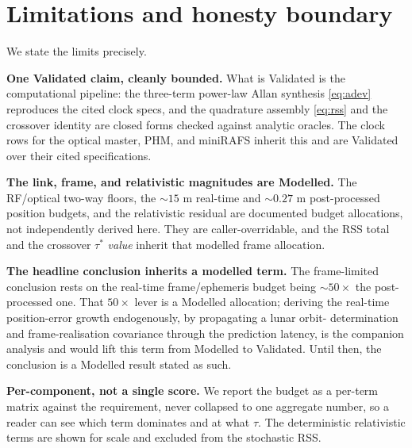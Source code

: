\documentclass[conference]{IEEEtran}
\begin{document}
\section{Limitations and honesty boundary}
\label{sec:honesty}
We state the limits precisely.

\textbf{One Validated claim, cleanly bounded.} What is Validated is the computational
pipeline: the three-term power-law Allan synthesis \eqref{eq:adev} reproduces the
cited clock specs, and the quadrature assembly \eqref{eq:rss} and the crossover
identity are closed forms checked against analytic oracles. The clock rows for the
optical master, PHM, and miniRAFS inherit this and are Validated over their cited
specifications.

\textbf{The link, frame, and relativistic magnitudes are Modelled.} The RF/optical
two-way floors, the $\sim$$15$ m real-time and $\sim$$0.27$ m post-processed position
budgets, and the relativistic residual are documented budget allocations, not
independently derived here. They are caller-overridable, and the RSS total and the
crossover $\tau^\ast$ \emph{value} inherit that modelled frame allocation.

\textbf{The headline conclusion inherits a modelled term.} The frame-limited
conclusion rests on the real-time frame/ephemeris budget being $\sim$$50\times$ the
post-processed one. That $50\times$ lever is a Modelled allocation; deriving the
real-time position-error growth endogenously, by propagating a lunar orbit-
determination and frame-realisation covariance through the prediction latency, is the
companion analysis \cite{baweja2026eop} and would lift this term from Modelled to
Validated. Until then, the conclusion is a Modelled result stated as such.

\textbf{Per-component, not a single score.} We report the budget as a per-term matrix
against the requirement, never collapsed to one aggregate number, so a reader can see
which term dominates and at what $\tau$. The deterministic relativistic terms are
shown for scale and excluded from the stochastic RSS.
\end{document}
